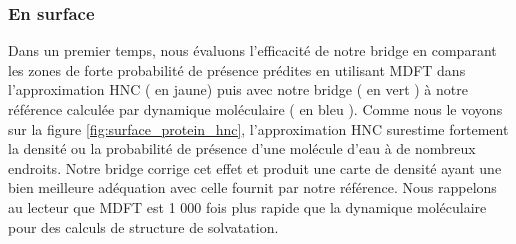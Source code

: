 \subsubsection{En surface}
Dans un premier temps, nous évaluons l'efficacité de notre bridge en comparant les zones de forte probabilité de présence prédites en utilisant MDFT dans l'approximation HNC ( en jaune) puis avec notre bridge ( en vert ) à notre référence calculée par dynamique moléculaire ( en bleu ). Comme nous le voyons sur la figure \ref{fig:surface_protein_hnc}, l'approximation HNC surestime fortement la densité ou la probabilité de présence d'une molécule d'eau à de nombreux endroits. Notre bridge corrige cet effet et produit une carte de densité ayant une bien meilleure adéquation avec celle fournit par notre référence. Nous rappelons au lecteur que MDFT est 1 000 fois plus rapide que la dynamique moléculaire pour des calculs de structure de solvatation.







\begin{center}
    \captionsetup{type=figure}
      \label{fig:surface_protein_hnc}
\end{center}


